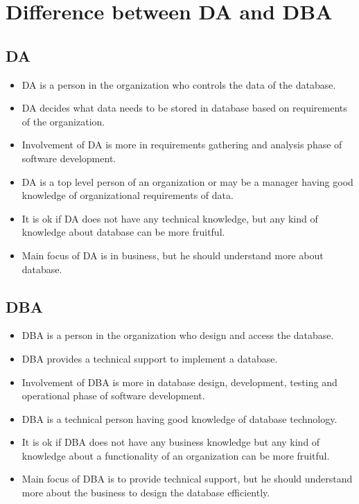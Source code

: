 \documentclass[12pt]{article}
\begin{document}
\section{Difference between DA and DBA}


\subsection{DA}

\begin{itemize}
	\item DA is a person in the organization who controls the data of the database.
	\item DA decides what data needs to be stored in database based on requirements of the organization.
	\item Involvement of DA is more in requirements gathering and analysis phase of software development.
	\item DA is a top level person of an organization or may be a manager having good knowledge of organizational requirements of data.
	\item It is ok if DA does not have any technical knowledge, but any kind of knowledge about database can be more fruitful.
	\item Main focus of DA is in  business, but he should understand more about database.
\end{itemize}


\subsection{DBA}

\begin{itemize}
	\item DBA is a person in the organization who design and access the database.
	\item DBA provides a technical support to implement a database.
	\item Involvement of DBA is more in database design, development, testing and operational phase of software development.
	\item DBA is a technical person having good knowledge of database technology.
	\item It is ok if DBA does not have any business knowledge but any kind of knowledge about a functionality of an organization can be more fruitful.
	\item Main focus of DBA is to provide technical support, but he should understand more about the business to design the database efficiently.
\end{itemize}
\end{document}
